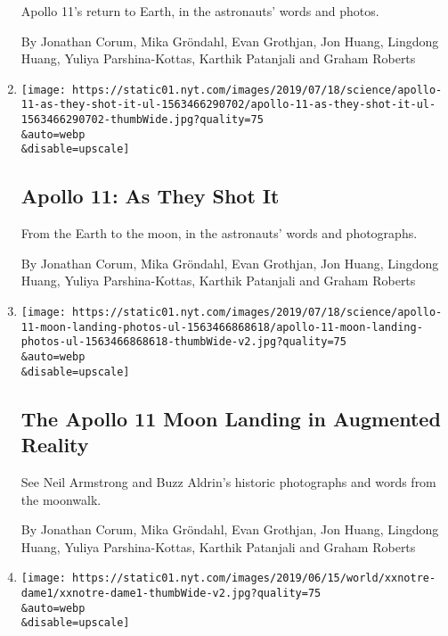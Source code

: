 \begin{enumerate}
  Apollo 11's return to Earth, in the astronauts' words and photos.

  By Jonathan Corum, Mika Gröndahl, Evan Grothjan, Jon Huang, Lingdong
  Huang, Yuliya Parshina-Kottas, Karthik Patanjali and Graham Roberts
\item
  \href{/interactive/2019/07/18/science/apollo-11-as-they-shot-it-ul.html}{}

  \texttt{[image: https://static01.nyt.com/images/2019/07/18/science/apollo-11-as-they-shot-it-ul-1563466290702/apollo-11-as-they-shot-it-ul-1563466290702-thumbWide.jpg?quality=75\\\&auto=webp\\\&disable=upscale]}

  \hypertarget{apollo-11-as-they-shot-it}{%
  \subsection{Apollo 11: As They Shot
  It}\label{apollo-11-as-they-shot-it}}

  From the Earth to the moon, in the astronauts' words and photographs.

  By Jonathan Corum, Mika Gröndahl, Evan Grothjan, Jon Huang, Lingdong
  Huang, Yuliya Parshina-Kottas, Karthik Patanjali and Graham Roberts
\item
  \href{/interactive/2019/07/18/science/apollo-11-moon-landing-photos-ul.html}{}

  \texttt{[image: https://static01.nyt.com/images/2019/07/18/science/apollo-11-moon-landing-photos-ul-1563466868618/apollo-11-moon-landing-photos-ul-1563466868618-thumbWide-v2.jpg?quality=75\\\&auto=webp\\\&disable=upscale]}

  \hypertarget{the-apollo-11-moon-landing-in-augmented-reality}{%
  \subsection{The Apollo 11 Moon Landing in Augmented
  Reality}\label{the-apollo-11-moon-landing-in-augmented-reality}}

  See Neil Armstrong and Buzz Aldrin's historic photographs and words
  from the moonwalk.

  By Jonathan Corum, Mika Gröndahl, Evan Grothjan, Jon Huang, Lingdong
  Huang, Yuliya Parshina-Kottas, Karthik Patanjali and Graham Roberts
\item
  \href{/interactive/2019/07/16/world/europe/notre-dame.html}{}

  \texttt{[image: https://static01.nyt.com/images/2019/06/15/world/xxnotre-dame1/xxnotre-dame1-thumbWide-v2.jpg?quality=75\\\&auto=webp\\\&disable=upscale]}


\end{enumerate}
